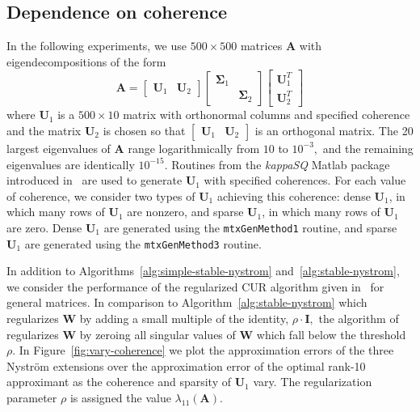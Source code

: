 \documentclass[11pt,letterpaper,twoside,reqno,nosumlimits]{amsart}
\def\transp{T}
\newcommand{\mat}[1]{\ensuremath{\mathbf{#1}}}
\theoremstyle{remark}
\begin{document}
\subsection{Dependence on coherence}
In the following experiments, we use $500 \times 500$ matrices $\mat{A}$ with eigendecompositions of the form
\begin{equation}
\mat{A} = [\begin{matrix} \mat{U}_1 & \mat{U}_2 \end{matrix}] 
 \left[ \begin{matrix} \mat{\Sigma}_1 & \\ & \mat{\Sigma}_2 \end{matrix} \right]
 \left[ \begin{matrix} \mat{U}_1^\transp \\ \mat{U}_2^\transp \end{matrix} \right]
 \label{eqn:coherenceA}
\end{equation}
where $\mat{U}_1$ is a $500 \times 10$ matrix with orthonormal columns and specified coherence and the matrix $\mat{U}_2$ is chosen so that $[\begin{matrix} \mat{U}_1 & \mat{U}_2 \end{matrix}]$ is an orthogonal matrix. The 20 largest eigenvalues of $\mat{A}$ range logarithmically from $10$ to $10^{-3},$ and the remaining eigenvalues are identically $10^{-15}.$ Routines from the \textit{kappaSQ} Matlab package introduced in~\cite{IW12} are used to generate $\mat{U}_1$ with specified coherences. For each value of coherence, we consider two types of $\mat{U}_1$ achieving this coherence: dense $\mat{U}_1$, in which many rows of $\mat{U}_1$ are nonzero, and sparse $\mat{U}_1$, in which many rows of $\mat{U}_1$ are zero. Dense $\mat{U}_1$ are generated using the \texttt{mtxGenMethod1} routine, and sparse $\mat{U}_1$ are generated using the \texttt{mtxGenMethod3} routine.

In addition to Algorithms~\ref{alg:simple-stable-nystrom} and~\ref{alg:stable-nystrom}, we consider the performance of the regularized CUR algorithm given in~\cite{CD11} for general matrices. In comparison to Algorithm~\ref{alg:stable-nystrom} which regularizes $\mat{W}$ by adding a small multiple of the identity, $\rho \cdot \mat{I},$ the algorithm of~\cite{CD11} regularizes $\mat{W}$ by zeroing all singular values of $\mat{W}$ which fall below the threshold $\rho.$ In Figure~\ref{fig:vary-coherence} we plot the approximation errors of the three Nystr\"om extensions over the approximation error of the optimal rank-10 approximant as the coherence and sparsity of $\mat{U}_1$ vary.
The regularization parameter $\rho$ is assigned the value $\lambda_{11}(\mat{A}).$
\end{document}
